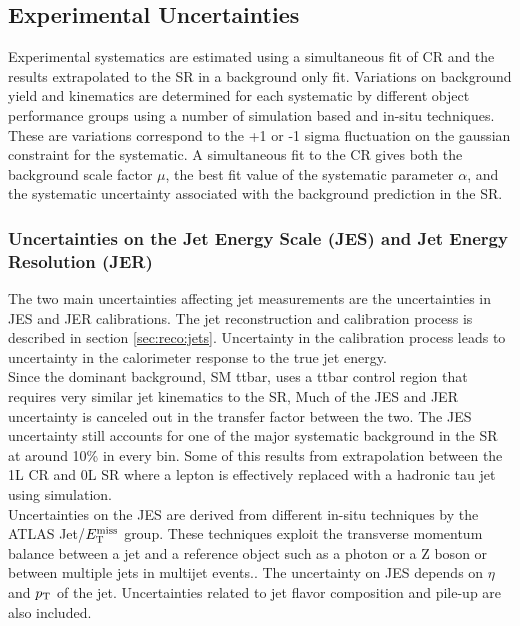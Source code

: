 \subsection{Experimental Uncertainties}
\label{sec:ExpSystematics}

\indent Experimental systematics are estimated using a simultaneous fit of CR and the results extrapolated to the SR in a background only fit.  Variations on background yield and kinematics are determined for each systematic by different object performance groups using a number of simulation based and in-situ techniques.  These are variations correspond to the +1 or -1 sigma fluctuation on the gaussian constraint for the systematic.  A simultaneous fit to the CR gives both the background scale factor $\mu$, the best fit value of the systematic parameter $\alpha$, and the systematic uncertainty associated with the background prediction in the SR. \\

\subsubsection*{Uncertainties on the Jet Energy Scale (JES) and Jet Energy Resolution (JER) } 

\indent The two main uncertainties affecting jet measurements are the uncertainties in JES and JER calibrations. The jet reconstruction and calibration process is described in section \ref{sec:reco:jets}.  Uncertainty in the calibration process leads to uncertainty in the calorimeter response to the true jet energy. \\

\indent Since the dominant background, SM ttbar, uses a ttbar control region that requires very similar jet kinematics to the SR, Much of the JES and JER uncertainty is canceled out in the transfer factor between the two.  The JES uncertainty still accounts for one of the major systematic background in the SR at around 10\% in every bin.  Some of this results from extrapolation between the 1L CR and 0L SR where a lepton is effectively replaced with a hadronic tau jet using simulation.  \\

\indent Uncertainties on the JES are derived from different in-situ techniques by the ATLAS Jet/$E_{\mathrm{T}}^{\mathrm{miss}}$ group.  These techniques exploit the transverse momentum balance between a jet and a reference object such as a photon or a Z boson or between multiple jets in multijet events.\cite{JES_ZGamma,JES_dijet}.  The uncertainty on JES depends on $\eta$ and $p_{\mathrm{T}}$ of the jet.  Uncertainties related to jet flavor composition and pile-up are also included.  \\

